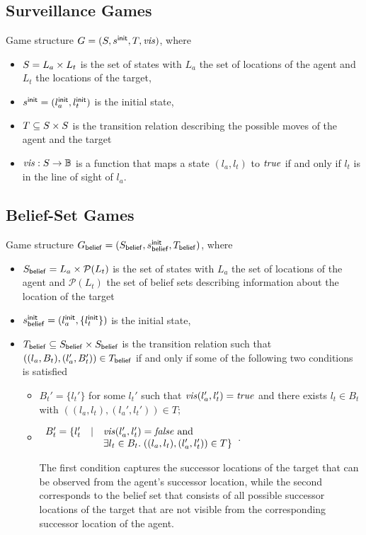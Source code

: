 \subsection{Surveillance Games}
Game structure $G  = (S,s^{\mathsf{init}},T,\mathit{vis})$, where
\begin{itemize}
\item $S = L_a \times L_t$ is the set of states with $L_a$ the set of locations of the agent and $L_t$ the locations of the target,
\item $s^{\mathsf{init}} = (l_a^{\mathsf{init}},l_t^{\mathsf{init}})$ is the initial state,
\item $T \subseteq S \times S$ is the transition relation describing the possible moves of the agent and the target
\item $\mathit{vis} : S \to \mathbb{B}$ is a function that maps a state $(l_a,l_t)$ to $\mathit{true}$ if and only if $l_t$ is in the line of sight of $l_a$.
\end{itemize}

\begin{example}
\end{example}
\subsection{Belief-Set Games}

Game structure $G_{\mathsf{belief}}  = (S_{\mathsf{belief}},s^{\mathsf{init}}_{\mathsf{belief}},T_{\mathsf{belief}})$, where
\begin{itemize}
\item $S_{\mathsf{belief}} = L_a \times \mathcal P(L_t)$ is the set of states with $L_a$ the set of locations of the agent and $\mathcal P(L_t)$ the set of belief sets describing information about the location of the target
\item $s^{\mathsf{init}}_{\mathsf{belief}} = (l_a^{\mathsf{init}},\{l_t^{\mathsf{init}}\})$ is the initial state,
\item $T_{\mathsf{belief}} \subseteq S_{\mathsf{belief}} \times S_{\mathsf{belief}}$ is the transition relation such that $((l_a, B_t),(l_a', B_t')) \in T_{\mathsf{belief}}$ if and only if some of the following two conditions is satisfied
\begin{itemize}
\item $B_t' = \{l_t'\}$ for some $l_t'$ such that $\mathit{vis}(l_a',l_t') = \mathit{true}$ and
there exists $l_t \in B_t$ with $((l_a,l_t),(l_a',l_t')) \in T$;
\item $\begin{array}{lll}
B_t' = \{l_t' & \mid & \mathit{vis}(l_a',l_t') = \mathit{false} \text{ and }\\
&&\exists l_t \in B_t.\; ((l_a,l_t),(l_a',l_t')) \in T\}
\end{array}
$. 

The first condition captures the successor locations of the target that can be observed from the agent's successor location, while the second  corresponds to the belief set that consists of all possible successor locations of the target that are not visible from the corresponding successor location of the agent.
\end{itemize}
\end{itemize}

